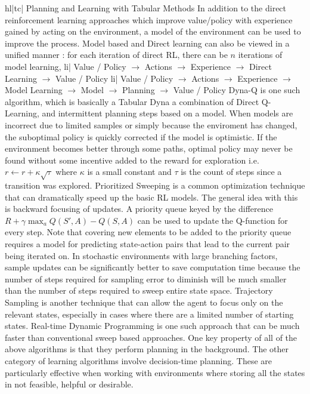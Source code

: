 hl|tc| Planning and Learning with Tabular Methods
In addition to the direct reinforcement learning approaches which improve value/policy with experience gained by acting on the environment, a model of the environment can be used to improve the process.
Model based and Direct learning can also be viewed in a unified manner : for each iteration of direct RL, there can be \(n \) iterations of model learning,
li| Value / Policy \( \rightarrow \) Actions \( \rightarrow \) Experience \( \rightarrow \) Direct Learning \( \rightarrow \) Value / Policy
li| Value / Policy \( \rightarrow \) Actions \( \rightarrow \) Experience \( \rightarrow \) Model Learning \( \rightarrow \) Model \( \rightarrow \) Planning \( \rightarrow \) Value / Policy
Dyna-Q is one such algorithm, which is basically a Tabular Dyna a combination of Direct Q-Learning, and intermittent planning steps based on a model.
When models are incorrect due to limited samples or simply because the enviroment has changed, the suboptimal policy is quickly corrected if the model is optimistic. If the environment becomes better through some paths, optimal policy may never be found without some incentive added to the reward for exploration i.e. \( r \leftarrow r + \kappa \sqrt{\tau} \) where \( \kappa \) is a small constant and \( \tau \) is the count of steps since a transition was explored.
Prioritized Sweeping is a common optimization technique that can dramatically speed up the basic RL models. The general idea with this is backward focusing of updates. A priority queue keyed by the difference \( R + \gamma \max_a Q(S', A) - Q(S, A) \) can be used to update the Q-function for every step. Note that covering new elements to be added to the priority queue requires a model for predicting state-action pairs that lead to the current pair being iterated on.
In stochastic environments with large branching factors, sample updates can be significantly better to save computation time because the number of steps required for sampling error to diminish will be much smaller than the number of steps required to sweep entire state space.
Trajectory Sampling is another technique that can allow the agent to focus only on the relevant states, especially in cases where there are a limited number of starting states. Real-time Dynamic Programming is one such approach that can be much faster than conventional sweep based approaches.
One key property of all of the above algorithms is that they perform planning in the background. The other category of learning algorithms involve decision-time planning. These are particularly effective when working with environments where storing all the states in not feasible, helpful or desirable.
